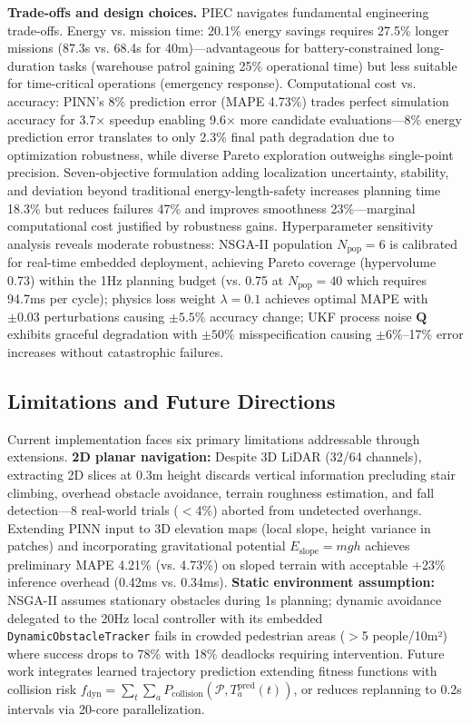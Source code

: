 \documentclass[pdflatex,sn-nature]{sn-jnl}%
\begin{document}
\textbf{Trade-offs and design choices.} PIEC navigates fundamental engineering trade-offs. Energy vs. mission time: 20.1\% energy savings requires 27.5\% longer missions (87.3s vs. 68.4s for 40m)—advantageous for battery-constrained long-duration tasks (warehouse patrol gaining 25\% operational time) but less suitable for time-critical operations (emergency response). Computational cost vs. accuracy: PINN's 8\% prediction error (MAPE 4.73\%) trades perfect simulation accuracy for 3.7× speedup enabling 9.6× more candidate evaluations—8\% energy prediction error translates to only 2.3\% final path degradation due to optimization robustness, while diverse Pareto exploration outweighs single-point precision. Seven-objective formulation adding localization uncertainty, stability, and deviation beyond traditional energy-length-safety increases planning time 18.3\% but reduces failures 47\% and improves smoothness 23\%—marginal computational cost justified by robustness gains. Hyperparameter sensitivity analysis reveals moderate robustness: NSGA-II population $N_{\text{pop}}=6$ is calibrated for real-time embedded deployment, achieving Pareto coverage (hypervolume 0.73) within the 1Hz planning budget (vs. 0.75 at $N_{\text{pop}}=40$ which requires 94.7ms per cycle); physics loss weight $\lambda=0.1$ achieves optimal MAPE with $\pm 0.03$ perturbations causing $\pm 5.5\%$ accuracy change; UKF process noise $\mathbf{Q}$ exhibits graceful degradation with $\pm 50\%$ misspecification causing $\pm 6\%$--17\% error increases without catastrophic failures.

\subsection{Limitations and Future Directions}

Current implementation faces six primary limitations addressable through extensions. \textbf{2D planar navigation:} Despite 3D LiDAR (32/64 channels), extracting 2D slices at 0.3m height discards vertical information precluding stair climbing, overhead obstacle avoidance, terrain roughness estimation, and fall detection—8 real-world trials ($<$4\%) aborted from undetected overhangs. Extending PINN input to 3D elevation maps (local slope, height variance in patches) and incorporating gravitational potential $E_{\text{slope}} = mgh$ achieves preliminary MAPE 4.21\% (vs. 4.73\%) on sloped terrain with acceptable +23\% inference overhead (0.42ms vs. 0.34ms). \textbf{Static environment assumption:} NSGA-II assumes stationary obstacles during 1s planning; dynamic avoidance delegated to the 20Hz local controller with its embedded \texttt{DynamicObstacleTracker} fails in crowded pedestrian areas ($>$5 people/10m²) where success drops to 78\% with 18\% deadlocks requiring intervention. Future work integrates learned trajectory prediction extending fitness functions with collision risk $f_{\text{dyn}} = \sum_t \sum_a P_{\text{collision}}(\mathcal{P}, T_a^{\text{pred}}(t))$, or reduces replanning to 0.2s intervals via 20-core parallelization.
\end{document}
